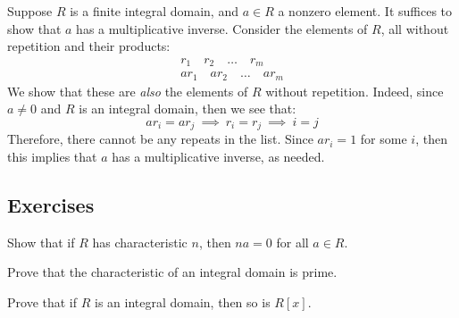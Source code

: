 \documentclass{article}
\begin{document}
\vspace{-0.1in}
\begin{pf}[source=Primary Source Material]
    Suppose $ R $ is a finite integral domain, and $ a \in R $ a nonzero element.
    It suffices to show that $ a $ has a multiplicative inverse. \vsp
    Consider the elements of $ R $, all without repetition and their products:
    \begin{gather*}
        r_{1} \quad r_{2} \quad \dots \quad r_{m} \\
        ar_{1} \quad ar_{2} \quad \dots \quad ar_{m}
    \end{gather*}
    We show that these are \textit{also} the elements of $ R $ without repetition.
    Indeed, since $ a \neq 0 $ and $ R $ is an integral domain, then we see that:
    \begin{equation*}
        ar_{i} = ar_{j} \ \implies \ r_{i} = r_{j} \ \implies \ i = j
    \end{equation*}
    Therefore, there cannot be any repeats in the list.
    Since $ ar_{i} = 1 $ for some $ i $, then this implies that $ a $ has a multiplicative
    inverse, as needed.
\end{pf}

\newpage
\subsection{Exercises}
\begin{exr}[source=Primary Source Material]
    Show that if $ R $ has characteristic $ n $, then $ na = 0 $ for all $ a \in R $.
\end{exr}

\begin{exr}[source=Primary Source Material]
    Prove that the characteristic of an integral domain is prime.
\end{exr}

\begin{exr}[source=Primary Source Material]
    Prove that if $ R $ is an integral domain, then so is $ R[x] $.
\end{exr}
\end{document}
